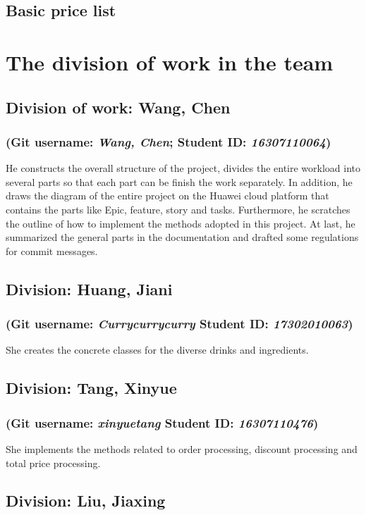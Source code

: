 \documentclass[a4paper]{report}
\begin{document}
\subsection{Basic price list}
\section{The division of work in the team}
\subsection{Division of work: Wang, Chen}
\subsubsection{(Git username: \emph{Wang, Chen}; Student ID: \emph{16307110064})}
He constructs the overall structure of the project, divides the entire workload into several parts so that each part can be finish the work separately. In addition, he draws the diagram of the entire project on the Huawei cloud platform that contains the parts like Epic, feature, story and tasks. Furthermore, he scratches the outline of how to implement the methods adopted in this project. At last, he summarized the general parts in the documentation and drafted some regulations for commit messages.

\subsection{Division: Huang, Jiani}
\subsubsection{(Git username: \emph{Currycurrycurry} Student ID: \emph{17302010063})}
She creates the concrete classes for the diverse drinks and ingredients.

\subsection{Division: Tang, Xinyue}
\subsubsection{(Git username: \emph{xinyuetang} Student ID: \emph{16307110476})}
She implements the methods related to order processing, discount processing and total price processing.

\subsection{Division: Liu, Jiaxing}
\end{document}
